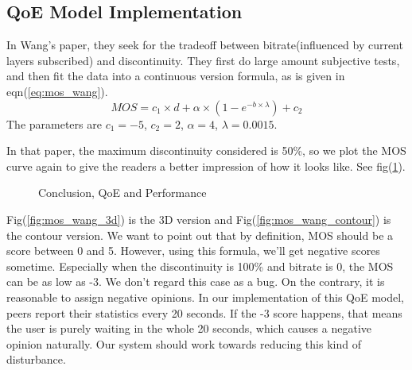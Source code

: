 \documentclass[11pt,a4paper]{article}
\begin{document}
\subsection{QoE Model Implementation}
\label{sec:simu_qoe}

In Wang's paper\cite{wang2011-perceptual}, they seek for the tradeoff
between bitrate(influenced by current layers subscribed) and discontinuity. 
They first do large amount subjective tests, and then fit the data into 
a continuous version formula, as is given in eqn(\ref{eq:mos_wang}). 
\begin{equation}
	MOS = c_1 \times d + \alpha \times (1 - e^{-b \times \lambda}) + c_2
	\label{eq:mos_wang}
\end{equation}
The parameters are $c_1=-5$, $c_2=2$, $\alpha=4$, $\lambda=0.0015$. 

In that paper, the maximum discontinuity considered is 50\%, so we 
plot the MOS curve again to give the readers a better impression of how
it looks like. See fig(\ref{fig:mos_wang}). 

\begin{figure}[htb]
\centering
	\caption{Conclusion, QoE and Performance}
	\label{fig:mos_wang}
\end{figure}

Fig(\ref{fig:mos_wang_3d}) is the 3D version and Fig(\ref{fig:mos_wang_contour})
is the contour version. We want to point out that by definition, MOS 
should be a score between 0 and 5. However, using this formula, we'll get
negative scores sometime. Especially when the discontinuity is 100\% and
bitrate is 0, the MOS can be as low as -3. We don't regard this case as 
a bug. On the contrary, it is reasonable to assign negative opinions. 
In our implementation of this QoE model, peers report their statistics every 
20 seconds. If the -3 score happens, that means the user is purely waiting 
in the whole 20 seconds, which causes a negative opinion naturally. 
Our system should work towards reducing this kind of disturbance. 
\end{document}
